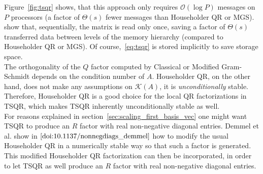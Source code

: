 \documentclass{scrartcl}
\numberwithin{equation}{section}
\begin{document}
Figure~\ref{fig:tsqr} shows, that this approach only requires $\mathcal{O}(\log P)$ messages on $P$ processors (a factor of $\Theta (s)$ fewer messages than Householder QR or MGS). \cite{Demmel:2012:CA-QR_demmel} show that, sequentially, the matrix is read only once, saving a factor of $\Theta(s)$ transferred data between levels of the memory hierarchy (compared to Householder QR or MGS). 
Of course,~\eqref{eq:tsqr} is stored implicitly to save storage space.\\
The orthogonality of the $Q$ factor computed by Classical or Modified Gram-Schmidt depends on the condition number of $A$. Householder QR, on the other hand, does not make any assumptions on $\mathcal{K}(A)$, it is \textit{unconditionally} stable. Therefore, Householder QR is a good choice for the local QR factorizations in TSQR, which makes TSQR inherently unconditionally stable as well.\\

For reasons explained in section~\ref{sec:scaling_first_basis_vec} one might want TSQR to produce an $R$ factor with real non-negative diagonal entries. Demmel et al. show in $\cite{doi:10.1137/nonnegdiags_demmel} $ how to modify the usual Householder QR in a numerically stable way so that such a factor is generated. This modified Householder QR factorization can then be incorporated, in order to let TSQR as well produce an $R$ factor with real non-negative diagonal entries.
\end{document}
